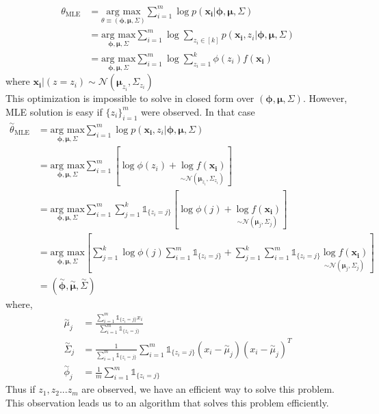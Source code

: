 \documentclass[a4paper,english,12pt]{article}
\begin{document}
\begin{align}
\theta_{\text{MLE}}&=\underset{\theta\equiv(\pmb{\phi},\boldsymbol{\mu},\Sigma)}{\text{arg max}}\sum_{i=1}^{m}\log{p\left(\boldsymbol{x_i}|\pmb{\phi},\boldsymbol{\mu},\Sigma\right)}\\
&=\underset{\pmb{\phi},\boldsymbol{\mu},\Sigma}{\text{arg max}}\sum_{i=1}^{m}\log{\sum_{z_i\in[k]}p\left(\boldsymbol{x_i},z_i|\pmb{\phi},\boldsymbol{\mu},\Sigma\right)}\\
&=\underset{\pmb{\phi},\boldsymbol{\mu},\Sigma}{\text{arg max}}\sum_{i=1}^{m}\log{\sum_{z_i=1}^{k}\phi(z_i)f(\boldsymbol{x_i})}
\end{align}
where $\boldsymbol{x_i}|(z=z_i)\sim\mathcal{N}\left(\boldsymbol{\mu}_{z_i},\Sigma_{z_i}\right)$\\
This optimization is impossible to solve in closed form over $(\pmb{\phi},\boldsymbol{\mu},\Sigma)$. However, MLE solution is easy if $\{ z_i \}_{i=1}^{m}$ were observed. In that case
\begin{align}
\overset{\sim}{\theta}_{\text{MLE}}&=\underset{\pmb{\phi},\boldsymbol{\mu},\Sigma}{\text{arg max}}\sum_{i=1}^{m}\log{p\left(\boldsymbol{x_i},z_i|\pmb{\phi},\boldsymbol{\mu},\Sigma\right)}\\
&=\underset{\pmb{\phi},\boldsymbol{\mu},\Sigma}{\text{arg max}}\sum_{i=1}^{m}\left[\log{\phi(z_i)}+\underset{\sim\mathcal{N}\left(\boldsymbol{\mu}_{z_i},\Sigma_{z_i}\right)}{\log{f(\boldsymbol{x_i})}}\right]\\
&=\underset{\pmb{\phi},\boldsymbol{\mu},\Sigma}{\text{arg max}}\sum_{i=1}^{m}\sum_{j=1}^{k}\mathds{1}_{\{z_i=j\}}\left[\log{\phi(j)}+\underset{\sim\mathcal{N}\left(\boldsymbol{\mu}_{j},\Sigma_{j}\right)}{\log{f(\boldsymbol{x_i})}}\right]\\
&=\underset{\pmb{\phi},\boldsymbol{\mu},\Sigma}{\text{arg max}}\left[\sum_{j=1}^{k}\log{\phi(j)}\sum_{i=1}^{m}\mathds{1}_{\{z_i=j\}}+\sum_{j=1}^{k}\sum_{i=1}^{m}\mathds{1}_{\{z_i=j\}}\underset{\sim\mathcal{N}\left(\boldsymbol{\mu}_{j},\Sigma_{j}\right)}{\log{f(\boldsymbol{x_i})}}\right]\\
&=\left(\overset{\sim}{\pmb{\phi}},\overset{\sim}{\boldsymbol{\mu}},\overset{\sim}{\Sigma }\right)
\end{align}
where,
\begin{align}
\overset{\sim}{\mu}_j&=\frac{\sum_{i=1}^{m}\mathds{1}_{\{z_i=j\}}x_i}{\sum_{i=1}^{m}\mathds{1}_{\{z_i=j\}}}\\
\overset{\sim}{\Sigma}_j&=\frac{1}{\sum_{i=1}^{m}\mathds{1}_{\{z_i=j\}}}\sum_{i=1}^{m}\mathds{1}_{\{z_i=j\}}\left(x_i-\overset{\sim}{\mu}_j\right)\left(x_i-\overset{\sim}{\mu}_j\right)^T\\
\overset{\sim}{\phi}_j&=\frac{1}{m}\sum_{i=1}^{m}\mathds{1}_{\{z_i=j\}}
\end{align}
Thus if $z_1, z_2...z_m$ are observed, we have an efficient way to solve this problem. This observation leads us to an algorithm that solves this problem efficiently.
\end{document}
